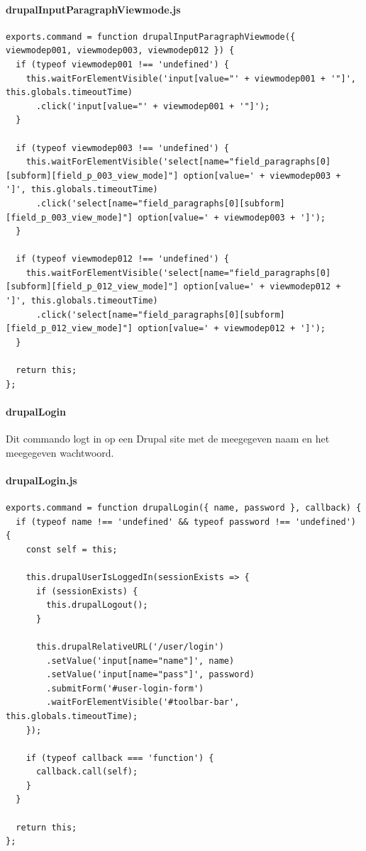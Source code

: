 \paragraph{drupalInputParagraphViewmode.js}
\begin{lstlisting}[breaklines=true]
exports.command = function drupalInputParagraphViewmode({ viewmodep001, viewmodep003, viewmodep012 }) {
  if (typeof viewmodep001 !== 'undefined') {
    this.waitForElementVisible('input[value="' + viewmodep001 + '"]', this.globals.timeoutTime)
      .click('input[value="' + viewmodep001 + '"]');
  }

  if (typeof viewmodep003 !== 'undefined') {
    this.waitForElementVisible('select[name="field_paragraphs[0][subform][field_p_003_view_mode]"] option[value=' + viewmodep003 + ']', this.globals.timeoutTime)
      .click('select[name="field_paragraphs[0][subform][field_p_003_view_mode]"] option[value=' + viewmodep003 + ']');
  }

  if (typeof viewmodep012 !== 'undefined') {
    this.waitForElementVisible('select[name="field_paragraphs[0][subform][field_p_012_view_mode]"] option[value=' + viewmodep012 + ']', this.globals.timeoutTime)
      .click('select[name="field_paragraphs[0][subform][field_p_012_view_mode]"] option[value=' + viewmodep012 + ']');
  }

  return this;
};
\end{lstlisting}


\clearpage
\paragraph{drupalLogin}
\label{commando27}
Dit commando logt in op een Drupal site met de meegegeven naam en het meegegeven wachtwoord.
\paragraph{drupalLogin.js}
\begin{lstlisting}[breaklines=true]
exports.command = function drupalLogin({ name, password }, callback) {
  if (typeof name !== 'undefined' && typeof password !== 'undefined') {
    const self = this;

    this.drupalUserIsLoggedIn(sessionExists => {
      if (sessionExists) {
        this.drupalLogout();
      }

      this.drupalRelativeURL('/user/login')
        .setValue('input[name="name"]', name)
        .setValue('input[name="pass"]', password)
        .submitForm('#user-login-form')
        .waitForElementVisible('#toolbar-bar', this.globals.timeoutTime);
    });

    if (typeof callback === 'function') {
      callback.call(self);
    }
  }

  return this;
};
\end{lstlisting}


